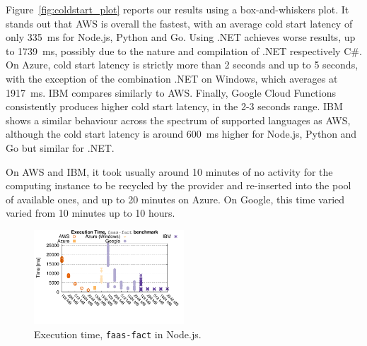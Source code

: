 Figure~\ref{fig:coldstart_plot} reports our results using a box-and-whiskers plot.
It stands out that \gls{AWS} is overall the fastest, with an average cold start latency of only 335~ms for Node.js, Python and Go. 
Using .NET achieves worse results, up to 1739~ms, possibly due to the nature and compilation of .NET respectively C\#. 
On Azure, cold start latency is strictly more than 2 seconds and up to 5 seconds, with the exception of the combination .NET on Windows, which averages at 1917~ms. 
IBM compares similarly to \gls{AWS}.
Finally, Google Cloud Functions consistently produces higher cold start latency, in the 2-3 seconds range. 
\gls{IBM} shows a similar behaviour across the spectrum of supported languages as \gls{AWS},  although the cold start latency is around 600~ms higher for Node.js, Python and Go but similar for .NET.

On \gls{AWS} and \gls{IBM}, it took usually around 10 minutes of no activity for the computing instance to be recycled by the provider and re-inserted into the pool of available ones, and up to 20 minutes on Azure. 
On Google, this time varied varied from 10 minutes up to 10 hours. %




\begin{figure}[!t]
\centering
\includegraphics[width=0.5\textwidth, trim={0 40 0 0}]{bilder/general_node/cpufact.pdf}
\caption{Execution time, \texttt{faas-fact} in Node.js.}
\label{fig:general_node_plot}
\end{figure}

